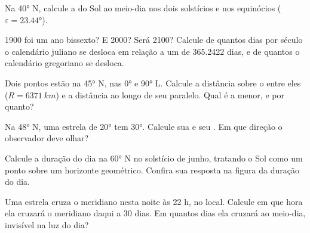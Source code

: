 \begin{exercise}[$\star$]\label{exo:b1:spherical-astronomy:3}
Na  \ang{40} N, calcule a  do Sol ao meio-dia nos dois solstícios e nos equinócios ($\varepsilon = \ang{23.44}$).
\end{exercise}

\begin{exercise}[$\star$]\label{exo:b1:spherical-astronomy:4}
1900 foi um ano bissexto? E 2000? Será 2100? Calcule de quantos dias por século o calendário juliano se desloca em relação a um  de 365.2422 dias, e de quantos o calendário gregoriano se desloca.
\end{exercise}

\begin{exercise}[$\star\star$]\label{exo:b1:spherical-astronomy:5}
Dois pontos estão na  \ang{45} N, nas  \ang{0} e \ang{90} L. Calcule a distância sobre o  entre eles ($R = \qty{6371}{km}$) e a distância ao longo de seu paralelo. Qual é a menor, e por quanto?
\end{exercise}

\begin{exercise}[$\star\star$]\label{exo:b1:spherical-astronomy:6}
Na  \ang{48} N, uma estrela de  \ang{20} tem  \ang{30}. Calcule sua  e seu . Em que direção o observador deve olhar?
\end{exercise}

\begin{exercise}[$\star\star$]\label{exo:b1:spherical-astronomy:7}
Calcule a duração do dia na  \ang{60} N no solstício de junho, tratando o Sol como um ponto sobre um horizonte geométrico. Confira sua resposta na figura da duração do dia.
\end{exercise}

\begin{exercise}[$\star\star$]\label{exo:b1:spherical-astronomy:8}
Uma estrela cruza o meridiano nesta noite às 22 h, no  local. Calcule em que hora ela cruzará o meridiano daqui a 30 dias. Em quantos dias ela cruzará ao meio-dia, invisível na luz do dia?
\end{exercise}

